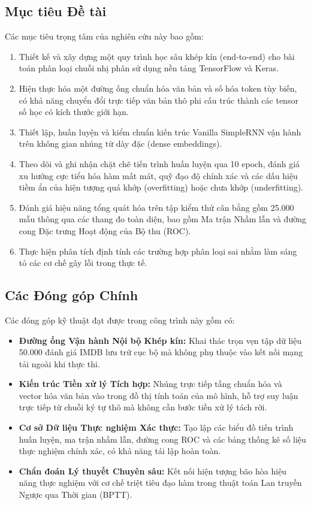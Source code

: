 \documentclass[11pt,a4paper]{article}
\begin{document}
\subsection{Mục tiêu Đề tài}
Các mục tiêu trọng tâm của nghiên cứu này bao gồm:
\begin{enumerate}
    \item Thiết kế và xây dựng một quy trình học sâu khép kín (end-to-end) cho bài toán phân loại chuỗi nhị phân sử dụng nền tảng TensorFlow và Keras.
    \item Hiện thực hóa một đường ống chuẩn hóa văn bản và số hóa token tùy biến, có khả năng chuyển đổi trực tiếp văn bản thô phi cấu trúc thành các tensor số học có kích thước giới hạn.
    \item Thiết lập, huấn luyện và kiểm chuẩn kiến trúc Vanilla SimpleRNN vận hành trên không gian nhúng từ dày đặc (dense embeddings).
    \item Theo dõi và ghi nhận chặt chẽ tiến trình huấn luyện qua 10 epoch, đánh giá xu hướng cực tiểu hóa hàm mất mát, quỹ đạo độ chính xác và các dấu hiệu tiềm ẩn của hiện tượng quá khớp (overfitting) hoặc chưa khớp (underfitting).
    \item Đánh giá hiệu năng tổng quát hóa trên tập kiểm thử cân bằng gồm 25.000 mẫu thông qua các thang đo toàn diện, bao gồm Ma trận Nhầm lẫn và đường cong Đặc trưng Hoạt động của Bộ thu (ROC).
    \item Thực hiện phân tích định tính các trường hợp phân loại sai nhằm làm sáng tỏ các cơ chế gây lỗi trong thực tế.
\end{enumerate}

\subsection{Các Đóng góp Chính}
Các đóng góp kỹ thuật đạt được trong công trình này gồm có:
\begin{itemize}
    \item \textbf{Đường ống Vận hành Nội bộ Khép kín:} Khai thác trọn vẹn tập dữ liệu 50.000 đánh giá IMDB lưu trữ cục bộ mà không phụ thuộc vào kết nối mạng tải ngoài khi thực thi.
    \item \textbf{Kiến trúc Tiền xử lý Tích hợp:} Nhúng trực tiếp tầng chuẩn hóa và vector hóa văn bản vào trong đồ thị tính toán của mô hình, hỗ trợ suy luận trực tiếp từ chuỗi ký tự thô mà không cần bước tiền xử lý tách rời.
    \item \textbf{Cơ sở Dữ liệu Thực nghiệm Xác thực:} Tạo lập các biểu đồ tiến trình huấn luyện, ma trận nhầm lẫn, đường cong ROC và các bảng thống kê số liệu thực nghiệm chính xác, có khả năng tái lập hoàn toàn.
    \item \textbf{Chẩn đoán Lý thuyết Chuyên sâu:} Kết nối hiện tượng bão hòa hiệu năng thực nghiệm với cơ chế triệt tiêu đạo hàm trong thuật toán Lan truyền Ngược qua Thời gian (BPTT).
\end{itemize}
\end{document}

